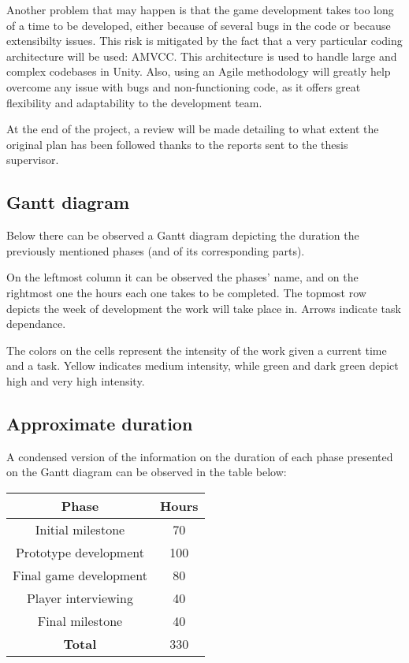 Another problem that may happen is that the game development takes too long
of a time to be developed, either because of several bugs in the code or because
extensibilty issues. This risk is mitigated by the fact that a very particular
coding architecture will be used: \gls{AMVCC}. This architecture is used
to handle large and complex codebases in Unity. Also, using an Agile methodology
will greatly help overcome any issue with bugs and non-functioning code, as
it offers great flexibility and adaptability to the development team.

At the end of the project, a review will be made detailing to what extent the original plan has been followed thanks to the reports sent to the thesis supervisor.

\subsection{Gantt diagram}

Below there can be observed a Gantt diagram depicting the duration the previously mentioned phases (and of its corresponding parts).

On the leftmost column it can be observed the phases' name, and on the rightmost one the hours each one takes to be completed. The topmost row depicts the week of development the work will take place in. Arrows indicate task dependance.

The colors on the cells represent the intensity of the work given a current time and a task. Yellow indicates medium intensity, while green and dark green depict high and very high intensity.


\subsection{Approximate duration}

A condensed version of the information on the duration of each phase presented on the Gantt diagram can be observed in the table below:

\begin{center}
    \begin{tabular}{ |c|c| } 
        \hline
        \textbf{Phase} & \textbf{Hours} \\
        \hline
        \hline
        Initial milestone & 70 \\ 
        \hline
        Prototype development & 100 \\ 
        \hline
        Final game development & 80 \\ 
        \hline
        Player interviewing & 40 \\ 
        \hline
        Final milestone & 40 \\ 
        \hline
        \hline
        \textbf{Total} & 330 \\ 
        \hline
    \end{tabular}
\end{center}

